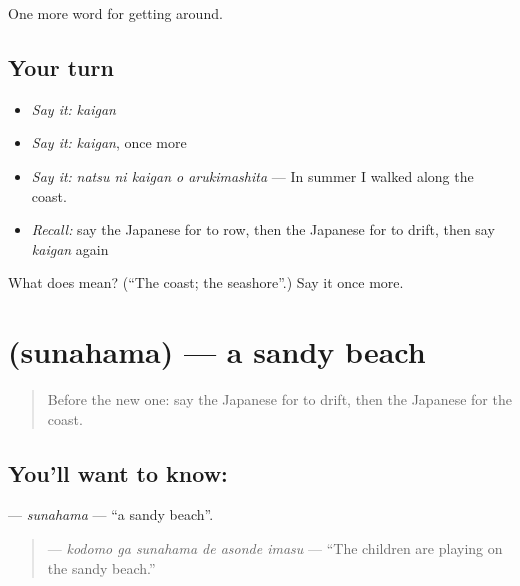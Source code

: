 \begin{grammarlens}[title={What you've built}]
One more word for getting around.
\end{grammarlens}

\subsection*{Your turn}
\begin{itemize}
\raggedright
  \item \emph{Say it:} \emph{kaigan}
  \item \emph{Say it:} \emph{kaigan}, once more
  \item \emph{Say it:} \emph{natsu ni kaigan o arukimashita} — In summer I walked along the coast.
  \item \emph{Recall:} say the Japanese for to row, then the Japanese for to drift, then say \emph{kaigan} again
\end{itemize}

\begin{tcolorbox}[breakable,colback=teal!4,colframe=teal!35!black,title={Before you move on}]
What does  mean? (\textquotedblleft{}The coast; the seashore\textquotedblright{}.) Say it once more.
\end{tcolorbox}
\section[\texorpdfstring{\ja{すなはま} (sunahama)}{すなはま (sunahama)}]{ (sunahama) — a sandy beach}

\label{lesson:JA-C382-sunahama}



\begin{quote}
Before the new one: say the Japanese for to drift, then the Japanese for the coast.
\end{quote}

\subsection*{You'll want to know: }
\textbf{} — \emph{sunahama} — \textquotedblleft{}a sandy beach\textquotedblright{}.

\begin{quote}
\textbf{  } — \emph{kodomo ga sunahama de asonde imasu} — \textquotedblleft{}The children are playing on the sandy beach.\textquotedblright{}
\end{quote}

